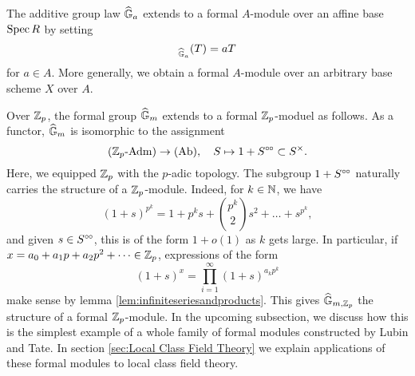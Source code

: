 \begin{xpl}
  The additive group law $\widehat{\mathbb{G}}_a$ extends to a formal $A$-module over an affine base
  $\operatorname{Spec} R$ by setting 
  \begin{equation*}
    [a]_{\GG_a}(T) = aT
  \end{equation*}
  for $a \in A$. More generally, we obtain a formal $A$-module over an
  arbitrary base scheme $X$ over $A$.

  Over $\mathbb{Z}_p$, the formal group $\widehat{\mathbb{G}}_m$ extends to a formal 
  $\mathbb{Z}_p$-moduel as follows. 
  As a functor, $\widehat{\mathbb{G}}_m$ is isomorphic to the assignment
  \begin{equation*}
    {({\mathbb{Z}_p}\text-\mathrm{Adm})} \to {(\mathrm{Ab})}, \quad S \mapsto 1 + S^{\circ \hspace{-0.5pt} \circ} \subset S^\times.
  \end{equation*}
  Here, we equipped $\mathbb{Z}_p$ with the $p$-adic topology.
  The subgroup $1 + S^{\circ \hspace{-0.5pt} \circ}$ naturally carries the structure of a $\mathbb{Z}_p$-module.
  Indeed, for $k \in \mathbb{N}$, we have
  \begin{equation*}
    (1+s)^{p^k} = 1 + p^ks + \binom{p^k}2 s^2 + \dots + s^{p^k},
  \end{equation*}
  and given $s \in S^{\circ \hspace{-0.5pt} \circ}$, this is of the form $1+ o(1)$ as $k$ gets large. 
  In particular, if $x = a_0 + a_1 p + a_2p^2 + \dots \in \mathbb{Z}_p$, expressions of
  the form
  \begin{equation*}
    (1+s)^x = \prod_{i = 1}^\infty (1+s)^{a_k p^k}
  \end{equation*}
  make sense by lemma \ref{lem:infiniteseriesandproducts}. This gives
  $\widehat{\mathbb{G}}_{m,\mathbb{Z}_p}$ the structure of a formal $\mathbb{Z}_p$-module. 
  In the upcoming subsection, we discuss how this is the simplest example of a
  whole family of formal modules constructed by 
  Lubin and Tate. In section \ref{sec:Local Class Field Theory} we explain applications of these formal modules to local class field theory.
\end{xpl}
